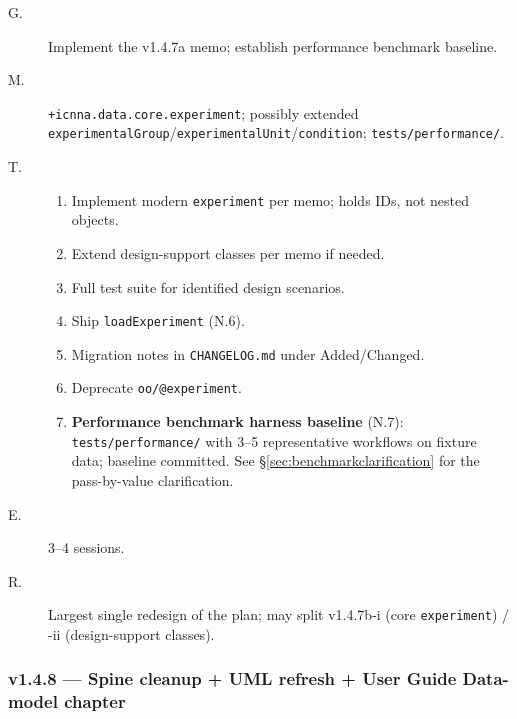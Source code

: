 \documentclass[11pt,a4paper]{article}
\begin{document}
\begin{description}
    \item[G.] Implement the v1.4.7a memo; establish performance benchmark baseline.
    \item[M.] \texttt{+icnna.data.core.experiment}; possibly extended \texttt{experimentalGroup}/\texttt{experimentalUnit}/\texttt{condition}; \texttt{tests/performance/}.
    \item[T.]
        \begin{enumerate}[nosep]
            \item Implement modern \texttt{experiment} per memo; holds IDs, not nested objects.
            \item Extend design-support classes per memo if needed.
            \item Full test suite for identified design scenarios.
            \item Ship \texttt{loadExperiment} (N.6).
            \item Migration notes in \texttt{CHANGELOG.md} under Added/Changed.
            \item Deprecate \texttt{oo/@experiment}.
            \item \textbf{Performance benchmark harness baseline} (N.7): \texttt{tests/performance/} with 3--5 representative workflows on fixture data; baseline committed. See \S\ref{sec:benchmarkclarification} for the pass-by-value clarification.
        \end{enumerate}
    \item[E.] 3--4 sessions.
    \item[R.] Largest single redesign of the plan; may split v1.4.7b-i (core \texttt{experiment}) / -ii (design-support classes).
\end{description}

\subsubsection*{v1.4.8 --- Spine cleanup + UML refresh + User Guide Data-model chapter}
\end{document}

